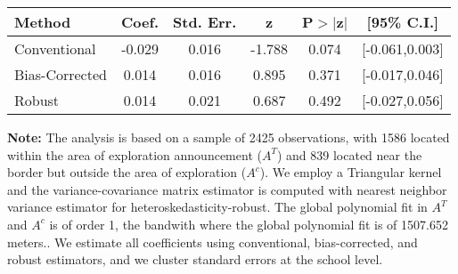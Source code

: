 \begin{table}[htbp]\centering
 \footnotesize 
\begin{tabular}{lccccc}
\hline\hline
Method & Coef. & Std. Err. & z & P$>|$z$|$ & [95\% C.I.] \\ 
\hline \hline  
Conventional & -0.029 & 0.016 & -1.788 & 0.074 & [-0.061,0.003] \\ 
 Bias-Corrected & 0.014 & 0.016 & 0.895 & 0.371 & [-0.017,0.046] \\ 
Robust & 0.014 & 0.021 & 0.687 & 0.492 & [-0.027,0.056] \\ 
  \hline\hline
\end{tabular}
\label{table:rd}
\begin{tablenotes} 
  \justifying \tiny \textbf{Note: }    
   The analysis is based on a sample of 2425 observations, with 1586 located within the area of exploration announcement ($A^{T}$) and 839 located near the border but outside the area of exploration  ($A^{c}$). 
           We employ a Triangular kernel and the variance-covariance matrix estimator is computed with nearest neighbor variance estimator for heteroskedasticity-robust. The global polynomial fit in  $A^{T}$ and $A^{c}$ is of order 1, the bandwith where the global polynomial fit is of 1507.652 meters.. We estimate all coefficients using conventional, bias-corrected, and robust estimators, and we cluster standard errors at the school level. \end{tablenotes} 
 \end{table} 
